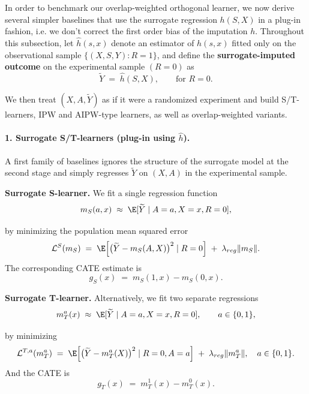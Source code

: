 \documentclass{article} %
\theoremstyle{plain} %
\theoremstyle{definition} %
\theoremstyle{remark} %
\begin{document}
In order to benchmark our overlap-weighted orthogonal learner, we now derive several simpler baselines that use the surrogate regression $h(S,X)$ in a plug-in fashion, i.e. we don't correct the first order bias of the imputation $h$. Throughout this subsection, let $\widehat{h}(s,x)$ denote an estimator of $h(s,x)$ fitted only on the observational sample $\{(X,S,Y):R=1\}$, and define the \textbf{surrogate-imputed outcome} on the experimental sample $(R=0)$ as
\begin{equation}
\label{eq:y-imputation-from-h}
    \widetilde{Y} \;=\; \widehat{h}(S,X), \qquad\text{for } R=0.
\end{equation}

We then treat $(X,A,\widetilde{Y})$ as if it were a randomized experiment and build S/T-learners, IPW and AIPW-type learners, as well as overlap-weighted variants.

\paragraph{1. Surrogate S/T-learners (plug-in using $\widehat{h}$).}
A first family of baselines ignores the structure of the surrogate model at the second stage and simply regresses $\widetilde{Y}$ on $(X,A)$ in the experimental sample.

\medskip
\noindent\textbf{Surrogate S-learner.}
We fit a single regression function
\begin{equation}
    m_S(a,x)\;\approx\;\E[\widetilde{Y}\mid A=a,X=x,R=0],
\end{equation}

by minimizing the population mean squared error
\begin{equation}
\label{eq:S-learner-loss}
    \mathcal{L}^{S}(m_S)
    \;=\;
    \E\Big[\bigl(\widetilde{Y}-m_S(A,X)\bigr)^2 \mid R=0\Big] \;+\; \lambda_{reg}\|m_S\|.
\end{equation}
The corresponding CATE estimate is
\begin{equation}
    g_S(x)
  \;=\; m_S(1,x)-m_S(0,x).
\end{equation}



\medskip
\noindent\textbf{Surrogate T-learner.}
Alternatively, we fit two separate regressions
\begin{equation}
    m_T^a(x) \;\approx\; \E[\widetilde{Y}\mid A=a,X=x,R=0],
\qquad a\in\{0,1\},
\end{equation}

by minimizing
\begin{equation}
    \mathcal{L}^{T,a}(m_T^a)
  \;=\;
  \E\Big[\bigl(\widetilde{Y}-m_T^a(X)\bigr)^2 \mid R=0,A=a\Big] \;+\; \lambda_{reg}\|m_T^a\|, \quad a \in \{0,1\}.
\end{equation}
And the CATE is
\begin{equation}
    g_T(x) \;=\; m_T^1(x)-m_T^0(x).
\end{equation}
\end{document}
